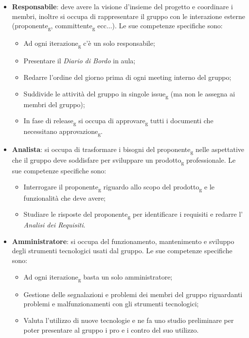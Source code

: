\begin{itemize}
\item \textbf{Responsabile}: deve avere la visione d'insieme del progetto e coordinare i membri, inoltre si occupa di rappresentare il gruppo con le interazione esterne (proponente\textsubscript{g}, committente\textsubscript{g} ecc...). Le sue competenze specifiche sono:
\begin{itemize}
	\item Ad ogni iterazione\textsubscript{g} c'è un solo responsabile;
	\item Presentare il \textit{Diario di Bordo} in aula;
	\item Redarre l'ordine del giorno prima di ogni meeting interno del gruppo;
	\item Suddivide le attività del gruppo in singole issue\textsubscript{g} (ma non le assegna ai membri del gruppo);
	\item In fase di release\textsubscript{g} si occupa di approvare\textsubscript{g} tutti i documenti che necessitano approvazione\textsubscript{g}.
\end{itemize}

\item \textbf{Analista}: si occupa di trasformare i bisogni del proponente\textsubscript{g} nelle aspettative che il gruppo deve soddisfare per sviluppare un prodotto\textsubscript{g} professionale. Le sue competenze specifiche sono:
\begin{itemize}
	\item Interrogare il proponente\textsubscript{g} riguardo allo scopo del prodotto\textsubscript{g} e le funzionalità che deve avere;
	\item Studiare le risposte del proponente\textsubscript{g} per identificare i requisiti e redarre l' \textit{Analisi dei Requisiti}.
\end{itemize}

\item \textbf{Amministratore}: si occupa del funzionamento, mantenimento e sviluppo degli strumenti tecnologici usati dal gruppo. Le sue competenze specifiche sono:
\begin{itemize}
	\item Ad ogni iterazione\textsubscript{g} basta un solo amministratore;
	\item Gestione delle segnalazioni e problemi dei membri del gruppo riguardanti problemi e malfunzionamenti con gli strumenti tecnologici;
	\item Valuta l'utilizzo di nuove tecnologie e ne fa uno studio preliminare per poter presentare al gruppo i pro e i contro del suo utilizzo.
\end{itemize}


\end{itemize}
